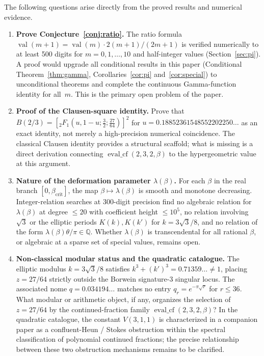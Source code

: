 \documentclass[11pt,a4paper]{article}
\theoremstyle{plain}
\theoremstyle{definition}
\theoremstyle{remark}
\begin{document}
The following questions arise directly from the proved results and
numerical evidence.

\begin{enumerate}
\item \textbf{Prove Conjecture~\ref{conj:ratio}.}
The ratio formula $\operatorname{val}(m{+}1) = \operatorname{val}(m)\cdot 2(m{+}1)/(2m{+}1)$
is verified numerically to at least 500 digits for $m = 0,1,\ldots,10$
and half-integer values (Section~\ref{sec:pi}).
A proof would upgrade all conditional results in this paper
(Conditional Theorem~\ref{thm:gamma}, Corollaries~\ref{cor:pi}
and~\ref{cor:special}) to unconditional theorems and complete the
continuous Gamma-function identity for all~$m$.
This is the primary open problem of the paper.

\item \textbf{Proof of the Clausen-square identity.}
Prove that $B(2/3) = [{}_{2}F_1(u,1-u;\tfrac{3}{2};\tfrac{27}{64})]^2$
for $u = 0.18852361548552202250\ldots$ as an exact identity,
not merely a high-precision numerical coincidence.
The classical Clausen identity provides a structural scaffold;
what is missing is a direct derivation connecting
$\operatorname{eval\_cf}(2,3,2,\beta)$ to the hypergeometric value at this argument.

\item \textbf{Nature of the deformation parameter $\lambda(\beta)$.}
For each $\beta$ in the real branch $[0, \beta_{\mathrm{crit}}]$,
the map $\beta \mapsto \lambda(\beta)$ is smooth and monotone decreasing.
Integer-relation searches at 300-digit precision find no algebraic
relation for $\lambda(\beta)$ at degree $\le 20$ with coefficient
height $\le 10^5$, no relation involving $\sqrt{3}$ or the elliptic
periods $K(k), K(k')$ for $k = 3\sqrt{3}/8$, and no relation
of the form $\lambda(\beta)\theta/\pi \in \mathbb{Q}$.
Whether $\lambda(\beta)$ is transcendental for all rational $\beta$,
or algebraic at a sparse set of special values, remains open.

\item \textbf{Non-classical modular status and the quadratic catalogue.}
The elliptic modulus $k = 3\sqrt{3}/8$ satisfies
$k^3 + (k')^3 = 0.71359\ldots \ne 1$,
placing $z = 27/64$ strictly outside the Borwein signature-3
singular locus.
The associated nome $q = 0.034194\ldots$ matches no entry
$q_r = e^{-\pi\sqrt{r}}$ for $r \le 36$.
What modular or arithmetic object, if any, organizes the
selection of $z = 27/64$ by the continued-fraction family
$\operatorname{eval\_cf}(2,3,2,\beta)$?
In the quadratic catalogue, the constant $V(3,1,1)$ is characterized
in a companion paper \citep{papanokechi2026spectral} as a
confluent-Heun / Stokes obstruction within the spectral classification
of polynomial continued fractions; the precise relationship between
these two obstruction mechanisms remains to be clarified.


\end{enumerate}
\end{document}
